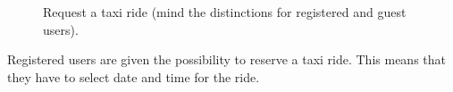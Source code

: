 \begin{figure}
	\hfill%
	\caption{Request a taxi ride (mind the distinctions for registered and guest users).}\label{fig:request}
\end{figure}

Registered users are given the possibility to reserve a taxi ride. This means that they have to select date and time for the ride. 

